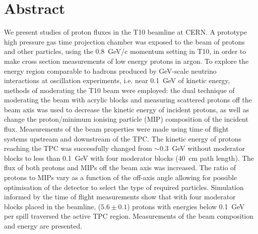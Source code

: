 \section*{Abstract}
We present studies of proton fluxes in the T10 beamline at CERN.
A prototype high pressure gas time projection chamber was exposed to the beam of protons and other particles, using the 0.8~GeV/c momentum setting in T10, in order to make cross section measurements of low energy protons in argon.
To explore the energy region comparable to hadrons produced by GeV-scale neutrino interactions at oscillation experiments, i.e. near 0.1~GeV of kinetic energy, methods of moderating the T10 beam were employed:
the dual technique of moderating the beam with acrylic blocks and measuring scattered protons off the beam axis was used to decrease the kinetic energy of incident protons, as well as change the proton/minimum ionising particle (MIP) composition of the incident flux.
Measurements of the beam properties were made using time of flight systems upstream and downstream of the TPC. 
The kinetic energy of protons reaching the TPC was successfully changed from $\sim$0.3~GeV without moderator blocks to less than 0.1~GeV with four moderator blocks (40~cm path length).
The flux of both protons and MIPs off the beam axis was increased.
The ratio of protons to MIPs vary as a function of the off-axis angle allowing for possible optimisation of the detector to select the type of required particles. 
Simulation informed by the time of flight measurements show that with four moderator blocks placed in the beamline,  ($5.6 \pm 0.1$) protons with energies below 0.1~GeV per spill traversed the active TPC region.
Measurements of the beam composition and energy are presented.
